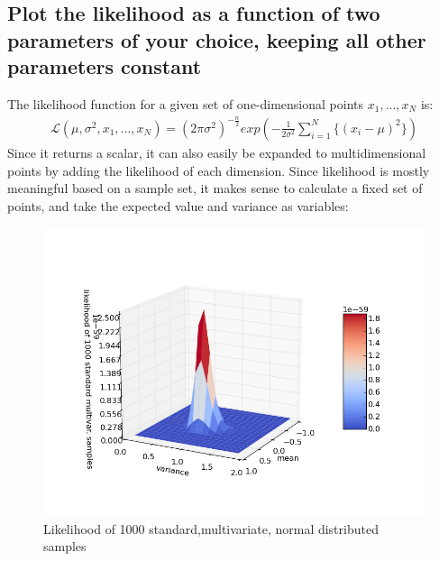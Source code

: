 \documentclass[11pt]{scrartcl} %
\begin{document}
         \subsection*{Plot the likelihood as a function of two parameters of your choice, keeping all other parameters constant}
         The likelihood function for a given set of one-dimensional points \(x_1, ..., x_N\) is:
         \begin{equation}\label{eq:8}
               \begin{split}
                 \mathcal{L}(\mu, \sigma^2, x_1, ..., x_N) = (2\pi\sigma^2)^{-\frac{n}{2}}exp\left(-\frac{1}{2\sigma^2}\sum_{i=1}^N\{(x_i-\mu)^2\} \right)
               \end{split}
             \end{equation}
         Since it returns a scalar, it can also easily be expanded to multidimensional points by adding the likelihood of each dimension. Since likelihood is mostly meaningful based on a sample set, it makes sense to calculate a fixed set of points, and take the expected value and variance as variables:
         \begin{figure}[ht]
	   \centering
           \includegraphics[width=1\textwidth, angle=0]{likelihood.png}
	   \caption{Likelihood of 1000 standard,multivariate, normal distributed samples}
	   \label{fig2}
         \end{figure}
\end{document}
